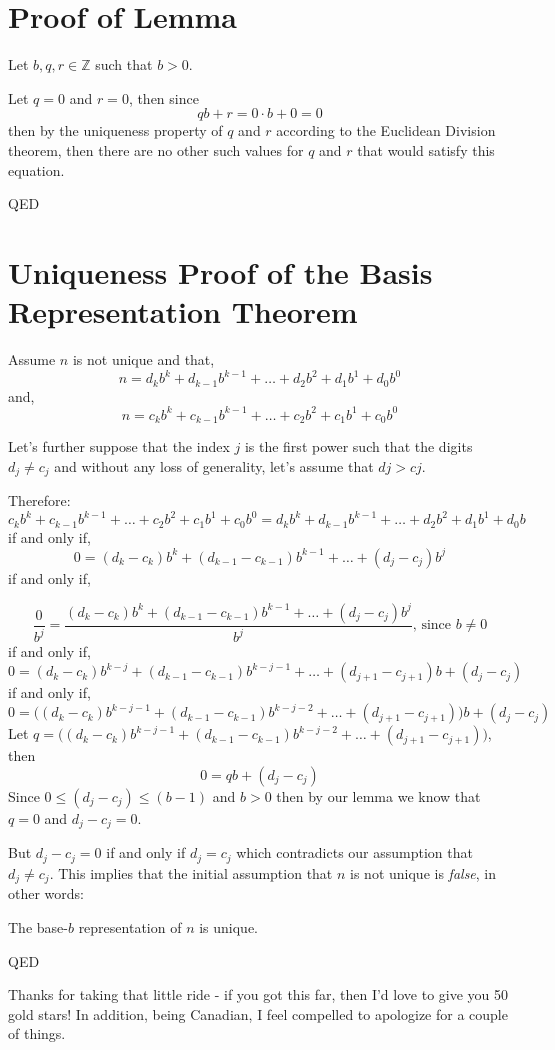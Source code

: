 \documentclass{article}
\newenvironment{jprIn}{\begin{adjustwidth}{2em}{}}{\end{adjustwidth}}
\begin{document}
\section*{Proof of Lemma}
\begin{jprIn}
Let $b, q, r \in{} \mathbb{Z}$ such that $b>0$.

Let $q=0$ and $r=0$, then since
\[qb+r=0\cdot{}b+0=0\]
then by the uniqueness property of $q$ and $r$ according to the Euclidean Division theorem,
then there are no other such values for $q$ and $r$ that would satisfy this equation.

QED
\end{jprIn}

\section*{Uniqueness Proof of the Basis Representation Theorem}

Assume $n$ is not unique and that,
\[n=d_kb^k+d_{k-1}b^{k-1}+\dots+d_2b^2+d_1b^1+d_0b^0\]
and,
\[n=c_kb^k+c_{k-1}b^{k-1}+\dots+c_2b^2+c_1b^1+c_0b^0\]

Let's further suppose that the index $j$ is the first power such that the digits $d_j\ne{}c_j$ and without any loss of generality,
let's assume that $dj>cj$.

Therefore:
\[c_kb^k+c_{k-1}b^{k-1}+\dots+c_2b^2+c_1b^1+c_0b^0=d_kb^k+d_{k-1}b^{k-1}+\dots+d_2b^2+d_1b^1+d_0b\]
if and only if,
\[0=(d_k-c_k)b^k+(d_{k-1}-c_{k-1})b^{k-1}+\dots+(d_j-c_j)b^j\]
if and only if,

\[\frac{0}{b^j}=\frac{(d_k-c_k)b^k+(d_{k-1}-c_{k-1})b^{k-1}+\dots+(d_j-c_j)b^j}{b^j}\text{, since }b\ne0\]
if and only if,
\[0=(d_k-c_k)b^{k-j}+(d_{k-1}-c_{k-1})b^{k-j-1}+\dots+(d_{j+1}-c_{j+1})b+(d_j-c_j)\]
if and only if,
\[0=\big((d_k-c_k)b^{k-j-1}+(d_{k-1}-c_{k-1})b^{k-j-2}+\dots+(d_{j+1}-c_{j+1})\big)b+(d_j-c_j)\]
Let $q=\big((d_k-c_k)b^{k-j-1}+(d_{k-1}-c_{k-1})b^{k-j-2}+\dots+(d_{j+1}-c_{j+1})\big)$, then
\[0=qb+(d_j-c_j)\]
Since $0\le(d_j-c_j)\le(b-1)$ and $b>0$ then by our lemma we know that\\
$q=0$ and $d_j-c_j = 0$.

But $d_j-c_j = 0$ if and only if $d_j = c_j$
which contradicts our assumption that $d_j\ne{}c_j$. This implies that the initial assumption that $n$
is not unique is \emph{false}, in other words:

The base-$b$ representation of $n$ is unique.

QED

\break
Thanks for taking that little ride - if you got this far,
then I'd love to give you 50 gold stars!
In addition, being Canadian, I feel compelled to apologize for a couple of things.
\end{document}
